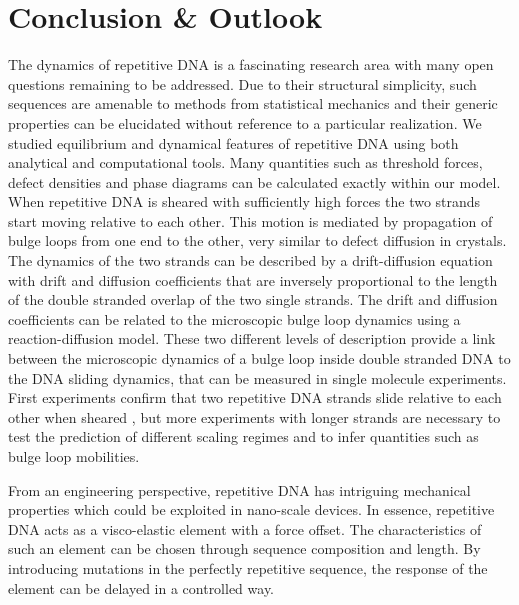 \section{Conclusion \& Outlook}
The dynamics of repetitive DNA is a fascinating research area with many open questions 
remaining to be addressed. Due to their structural simplicity, such sequences are amenable to
methods from statistical mechanics and their generic properties can be elucidated 
without reference to a particular realization. We studied equilibrium and dynamical 
features of repetitive DNA using both analytical and computational tools. Many quantities such as
threshold forces, defect densities and phase diagrams can be calculated exactly within our model. 
When repetitive DNA  is sheared with sufficiently high forces the two strands start moving relative to each other. 
This motion is mediated by propagation of bulge loops from one end to the other, very similar to 
defect diffusion in crystals. The dynamics of the two strands can be described
by a drift-diffusion equation with drift and diffusion coefficients that are inversely proportional to 
the length of the double stranded overlap of the two single strands. The drift and diffusion coefficients 
can be related to the microscopic bulge loop dynamics using a reaction-diffusion model. These two 
different levels of description provide a link between the microscopic dynamics of a bulge loop inside 
double stranded DNA to the DNA sliding dynamics, that can be measured in single molecule 
experiments. First experiments confirm that two repetitive DNA strands slide relative
to each other when sheared \cite{Kuehner_BiophysJ_07}, but more experiments with longer strands are necessary to test the prediction
of different scaling regimes and to infer quantities such as bulge loop mobilities. 

From an engineering perspective, repetitive DNA has intriguing mechanical properties which could
be exploited in nano-scale devices. In essence, repetitive DNA acts as a visco-elastic element with 
a force offset. The characteristics of such an element can be chosen through sequence composition 
and length. By introducing mutations in the perfectly repetitive sequence, the response of the element
can be delayed in a controlled way.

